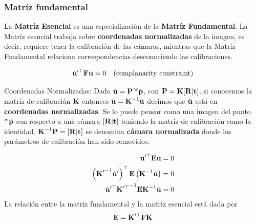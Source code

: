 \begin{frame}
    \frametitle{Matríz fundamental}
    \footnotesize
    
    La {\bf Matríz Esencial} es una especialización de la {\bf Matríz Fundamental}. La Matríz esencial trabaja sobre {\bf coordenadas  normalizadas}  de la imagen, es decir, requiere tener la calibración de las cámaras, mientras que la Matríz Fundamental relaciona correspondencias desconociendo las calibraciones.
    
    	\begin{equation*}
    	\dot{\boldsymbol{\mathbf{u}}}^{\prime\top} \boldsymbol{\mathbf{F}} \dot{\boldsymbol{\mathbf{u}}} = 0 \quad \text{(complanarity constraint)}
    \end{equation*}
    
    \begin{block}{Coordenadas Normalizadas:}
	    Dado $\dot{\boldsymbol{\mathbf{u}}} = \boldsymbol{\mathbf{P}} \prescript{\mathrm{\mathrm{w}}}{}{\dot{\boldsymbol{\mathbf{p}}}}$, con $\boldsymbol{\mathbf{P}} = \boldsymbol{\mathbf{K}} [\boldsymbol{\mathbf{R}}|\boldsymbol{\mathbf{t}}]$, si conocemos la matríz de calibración $\boldsymbol{\mathbf{K}}$ entonces $\hat{\boldsymbol{\mathbf{u}}} = {\boldsymbol{\mathbf{K}}}^{-1} \dot{\boldsymbol{\mathbf{u}}}$ decimos que $\hat{\boldsymbol{\mathbf{u}}}$ está en {\bf coordenadas normalizadas}. Se lo puede pensar como una imagen del punto $\prescript{\mathrm{\mathrm{w}}}{}{\dot{\boldsymbol{\mathbf{p}}}}$ con respecto a una cámara $[\boldsymbol{\mathbf{R}}|\boldsymbol{\mathbf{t}}]$ teniendo la matriz de calibración como la identidad. $ {\boldsymbol{\mathbf{K}}}^{-1} \boldsymbol{\mathbf{P}} = [\boldsymbol{\mathbf{R}}| \boldsymbol{\mathbf{t}}]$ se denomina {\bf cámara normalizada} donde los parámetros de calibración han sido removidos.
    \end{block}
    

    
    \begin{align*}
		\dot{\boldsymbol{\mathbf{u}}}^{\prime\top} \boldsymbol{\mathbf{E}} \dot{\boldsymbol{\mathbf{u}}} &= 0\\
		\left( {\boldsymbol{\mathbf{K}}^{\prime}}^{-1} \dot{\boldsymbol{\mathbf{u}}}^{\prime} \right)^{\top} \boldsymbol{\mathbf{E}} \left( {\boldsymbol{\mathbf{K}}}^{-1} \dot{\boldsymbol{\mathbf{u}}} \right) &= 0\\
		\dot{\boldsymbol{\mathbf{u}}}^{\prime\top} {\boldsymbol{\mathbf{K}}^{\prime\top}}^{-1} \boldsymbol{\mathbf{E}} {\boldsymbol{\mathbf{K}}}^{-1} \dot{\boldsymbol{\mathbf{u}}}&= 0
    \end{align*}
	La relación entre la matriz fundamental y la matríz esencial está dada por
    \begin{equation*}
		\boldsymbol{\mathbf{E}} = \boldsymbol{\mathbf{K}}^{\prime\top} \boldsymbol{\mathbf{F}} \boldsymbol{\mathbf{K}}
	\end{equation*}
    
    
\end{frame}

